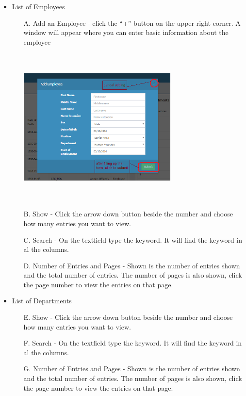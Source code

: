 \begin{itemize}
	\item List of Employees
	\begin{enumerate}
		\item[A.] Add an Employee - click the “+” button on the upper right corner. A window will appear where you can enter basic information about the employee \\
		\begin{center}
			\includegraphics[width=8cm,height=8cm]{image/addemp_um.png}
		\end{center}
		
		\item[B.] Show - Click the arrow down button beside the number and choose how many entries you want to view.
		\item[C.] Search - On the textfield type the keyword. It will find the keyword in al the columns.
		\item[D.] Number of Entries and Pages - Shown is the number of entries shown and the total number of entries. The number of pages is also shown, click the page number to view the entries on that page.
	\end{enumerate}
	\item List of Departments
	\begin{enumerate}
		\item[E.]Show - Click the arrow down button beside the number and choose how many entries you want to view.
		\item[F.] Search - On the textfield type the keyword. It will find the keyword in al the columns.
		\item[G.] Number of Entries and Pages - Shown is the number of entries shown and the total number of entries. The number of pages is also shown, click the page number to view the entries on that page.
	\end{enumerate}
\end{itemize}
